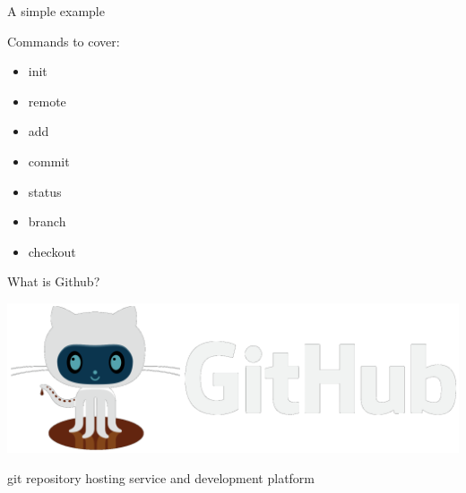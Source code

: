 \documentclass[12pt]{beamer}
\begin{document}
\begin{frame}

	\begin{flushright}
	\Large \textcolor{boss2}{A simple example} 
	\end{flushright}

	\textcolor{boss3}{Commands to cover:}

	\begin{itemize}
		\item init
		\item remote
		\item add
		\item commit
		\item status
		\item branch
		\item checkout
	\end{itemize}

\end{frame}





\begin{frame}

\end{frame}



















\begin{frame}

	\begin{flushright}
		\Large \textcolor{boss2}{What is Github?} 
	\end{flushright}

  \begin{center}
    \includegraphics[width=\textwidth]{figs/github.png}
  \end{center}

	\textcolor{boss3}{git repository hosting service and development platform}

\end{frame}
\end{document}
